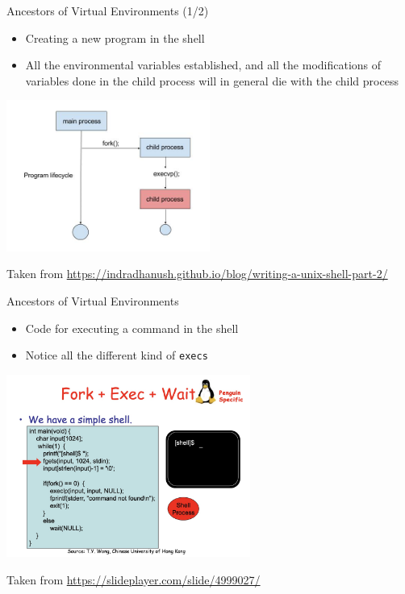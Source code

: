 \documentclass{beamer}
\begin{document}
\begin{frame}
{\centerline{Ancestors of Virtual Environments (1/2)}}
\begin{itemize}
    \item Creating a new program in the shell
    \item All the environmental variables established, and all the modifications of variables done in the child process will in general die with the child process
\end{itemize} 
\begin{center}
    \includegraphics[width=0.5\textwidth]{Coding/execvp.jpg}
\end{center}

\begin{center}
    \tiny{Taken from \url{https://indradhanush.github.io/blog/writing-a-unix-shell-part-2/}}
\end{center}


\end{frame}

\begin{frame}
{\centerline{Ancestors of Virtual Environments}}
\begin{itemize}
    \item Code for executing a command in the shell
    \item Notice all the different kind of \texttt{execs}
\end{itemize} 
\begin{center}
    \includegraphics[width=0.6\textwidth]{Coding/forkExec.jpg}
\end{center}

\begin{center}
    \tiny{Taken from \url{https://slideplayer.com/slide/4999027/}}
\end{center}


\end{frame}
\end{document}
